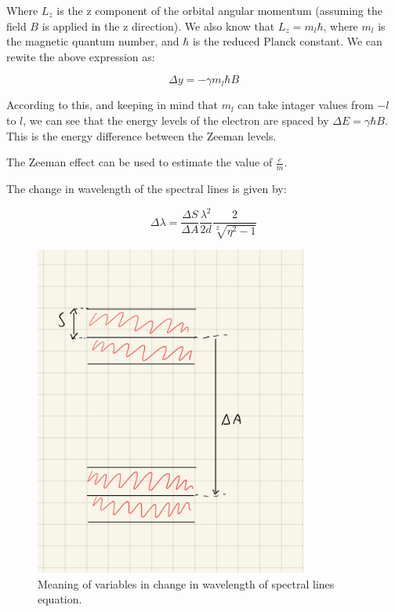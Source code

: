 Where $L_z$ is the z component of the orbital angular momentum (assuming the field $B$ is applied in the z direction). We also know that
$L_z = m_l \hbar$, where $m_l$ is the magnetic quantum number, and $\hbar$ is the reduced Planck constant. We can rewite the above expression as:

\begin{equation}
    \Delta y = - \gamma m_l \hbar B
\end{equation}

According to this, and keeping in mind that $m_l$ can take intager values from $-l$ to $l$, we can see that the energy levels of the electron
are spaced by $\Delta E = \gamma \hbar B$. This is the energy difference between the Zeeman levels.



The Zeeman effect can be used to estimate the value of $\frac{e}{m}$.

The change in wavelength of the spectral lines is given by:

\begin{equation}
    \Delta \lambda = \frac{\Delta S}{\Delta A} \frac{\lambda^2}{2d} \frac{2}{\sqrt[2]{\eta^2 - 1}}
\end{equation}


\begin{figure}
    \centering
    \includegraphics[width=0.8\textwidth]{intro/lambda_calc_diagram.jpeg}
    \caption{Meaning of variables in change in wavelength of spectral lines equation.}
    \label{fig:variables_lambda}
\end{figure}


